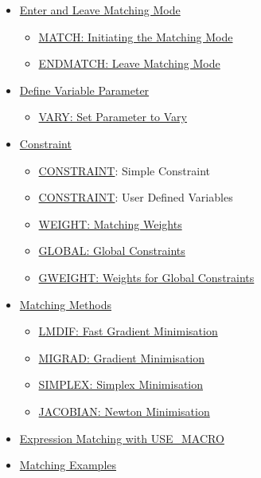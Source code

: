 \begin{itemize}
\item \href{match_main.html}{Enter and Leave Matching Mode}
  \begin{itemize}
  \item \href{match_main.html#match}{MATCH: Initiating the Matching Mode}
  \item \href{match_main.html#endmatch}{ENDMATCH: Leave Matching Mode}
  \end{itemize}
\item \href{match_vary.html}{Define Variable Parameter}
  \begin{itemize}
  \item \href{match_vary.html#vary}{VARY: Set Parameter to Vary}
  \end{itemize}
\item \href{match_con.html}{Constraint}
  \begin{itemize}
  \item \href{match_con.html#constraint}{CONSTRAINT}: Simple Constraint 
  \item \href{match_con.html#user-var}{CONSTRAINT}: User Defined Variables 
  \item \href{match_con.html#weight}{WEIGHT: Matching Weights}
  \item \href{match_con.html#global}{GLOBAL: Global Constraints}
  \item \href{match_con.html#global}{GWEIGHT: Weights for Global Constraints}
  \end{itemize}
\item \href{match_xeq.html}{Matching Methods}
  \begin{itemize}
  \item \href{match_xeq.html#lmdif}{LMDIF: Fast Gradient Minimisation}
  \item \href{match_xeq.html#migrad}{MIGRAD: Gradient Minimisation}
  \item \href{match_xeq.html#simplex}{SIMPLEX: Simplex Minimisation}
  \item \href{match_xeq.html#jacobian}{JACOBIAN: Newton Minimisation}
  \end{itemize}
\item \href{match_um.html}{Expression Matching with USE\_MACRO}
\item \href{match_xmpl.html}{Matching Examples}
\end{itemize}



